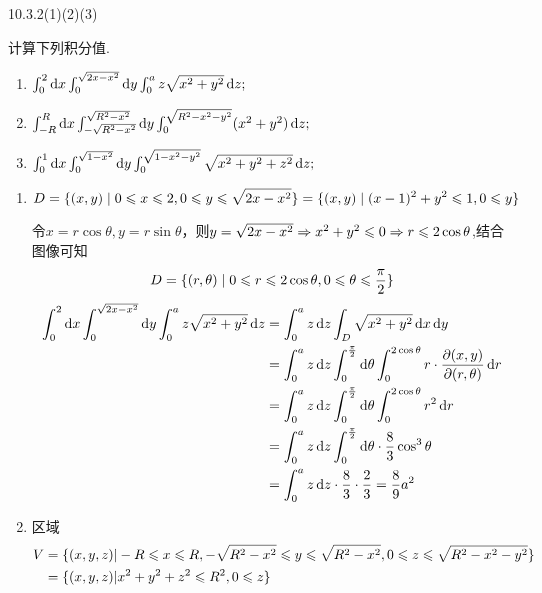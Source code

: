 \begin{exercise}
    {10.3.2(1)(2)(3)}

    计算下列积分值.
    \begin{enumerate}
        \item $\int_0^2 \operatorname{d\!} x \int_0^{\sqrt{2x-x^2}} \operatorname{d\!} y \int_0^a z \sqrt{x^2 + y^2} \operatorname{d\!} z;$
        \item $\int_{-R}^R \operatorname{d\!} x \int_{- \sqrt{R^2 - x^2}}^{\sqrt{R^2 - x^2}} \operatorname{d\!} y \int_0^{\sqrt{R^2 - x^2 - y^2}} (x^2 + y^2 ) \operatorname{d\!} z;$
        \item $\int_0^1 \operatorname{d\!} x \int_0^{\sqrt{1-x^2}} \operatorname{d\!} y \int_0^{\sqrt{1-x^2-y^2}} \sqrt{x^2+y^2+z^2} \operatorname{d\!} z;$
    \end{enumerate}
\end{exercise}

\begin{solution}
    \begin{enumerate}
        \item $$
        D = \{(x,y) \mid 0 \leqslant x \leqslant 2, 0 \leqslant y \leqslant \sqrt{2x - x^2} \} = \{ (x,y) \mid (x-1)^2 + y^2 \leqslant 1, 0 \leqslant y\}
        $$

        令$x = r \cos\theta, y = r \sin\theta$，则$y = \sqrt{2x - x^2} \Rightarrow x^2 + y^2 \leqslant 0 \Rightarrow r \leqslant 2\cos\theta$,结合图像可知
        $$
        D = \{ (r, \theta) \mid 0 \leqslant r \leqslant 2\cos\theta, 0 \leqslant \theta \leqslant \frac{\pi}{2} \}
        $$
        \begin{align*}
            \int_0^2 \dif x \int_0^{\sqrt{2x-x^2}} \dif y \int_0^a z \sqrt{x^2 + y^2} \dif z 
            &= \int_0^a z \dif z \int_D \sqrt{x^2 + y^2} \dif x \dif y \\
            &= \int_0^a z \dif z \int_0^{\frac{\pi}{2}} \dif \theta \int_0^{2\cos\theta} r \cdot \pdv{(x,y)}{(r,\theta)} \dif r \\
            &= \int_0^a z \dif z \int_0^{\frac{\pi}{2}} \dif \theta \int_0^{2\cos\theta} r^2 \dif r\\
            &= \int_0^a z \dif z \int_0^{\frac{\pi}{2}} \dif \theta \cdot \frac{8}{3} \cos^3\theta\\
            &= \int_0^a z \dif z \cdot \frac{8}{3} \cdot \frac{2}{3} = \frac{8}{9} a^2
        \end{align*}
        \item 区域
        \begin{align*}
            V &= \{ (x,y,z) | -R \leqslant x \leqslant R, -\sqrt{R^2 - x^2} \leqslant y \leqslant \sqrt{R^2 - x^2}, 0 \leqslant z \leqslant \sqrt{R^2 - x^2 - y^2} \} \\
            &= \{ (x,y,z) | x^2 + y^2 + z^2 \leqslant R^2, 0 \leqslant z \}
        \end{align*}


\end{enumerate}
\end{solution}

